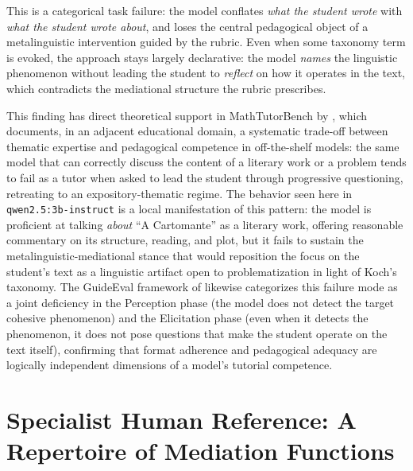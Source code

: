 \documentclass{sbc2023}%
\begin{document}
This is a categorical task failure: the model conflates \textit{what the student wrote} with \textit{what the student wrote about}, and loses the central pedagogical object of a metalinguistic intervention guided by the rubric. Even when some taxonomy term is evoked, the approach stays largely declarative: the model \textit{names} the linguistic phenomenon without leading the student to \textit{reflect} on how it operates in the text, which contradicts the mediational structure the rubric prescribes.

This finding has direct theoretical support in MathTutorBench by \citet{macina2025mathtutorbench}, which documents, in an adjacent educational domain, a systematic trade-off between thematic expertise and pedagogical competence in off-the-shelf models: the same model that can correctly discuss the content of a literary work or a problem tends to fail as a tutor when asked to lead the student through progressive questioning, retreating to an expository-thematic regime. The behavior seen here in \texttt{qwen2.5:3b-instruct} is a local manifestation of this pattern: the model is proficient at talking \textit{about} ``A Cartomante'' as a literary work, offering reasonable commentary on its structure, reading, and plot, but it fails to sustain the metalinguistic-mediational stance that would reposition the focus on the student's text as a linguistic artifact open to problematization in light of Koch's taxonomy. The GuideEval framework of \citet{liu2025socratic} likewise categorizes this failure mode as a joint deficiency in the Perception phase (the model does not detect the target cohesive phenomenon) and the Elicitation phase (even when it detects the phenomenon, it does not pose questions that make the student operate on the text itself), confirming that format adherence and pedagogical adequacy are logically independent dimensions of a model's tutorial competence.

\section{Specialist Human Reference: A Repertoire of Mediation Functions}
\label{sec:mediation}
\end{document}
